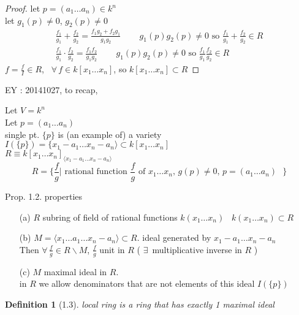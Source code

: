 \documentclass[10pt]{amsart}
\newtheorem{definition}{Definition}
\begin{document}
\begin{multicols*}{2}
\begin{proof}
let $p = (a_1 \dots a_n) \in k^n$ \\
let $g_1(p) \neq 0$, $g_2(p) \neq 0$ 
\[
\begin{gathered}
  \frac{f_1}{g_1 } + \frac{f_2}{g_2} = \frac{f_1 g_2 + f_2 g_1}{ g_1 g_2 } \quad \quad \,  g_1(p)g_2(p) \neq 0 \text{ so } \frac{f_1}{g_1} + \frac{f_2}{g_2} \in R \\
 \frac{f_1}{g_1} \cdot \frac{f_2}{g_2} = \frac{f_1 f_2}{g_1 g_2} \quad \quad \, g_1(p) g_2(p) \neq 0 \text{ so } \frac{f_1}{g_1}\frac{f_2}{g_2} \in R
\end{gathered}
\]
$f= \frac{f}{I} \in R$, \quad \, $\forall \, f\in k[x_1 \dots x_n]$, so $k[x_1 \dots x_n]\subset R$

\end{proof}

EY : 20141027, to recap, 

Let $V = k^n$ \\
Let $p = (a_1 \dots a_n)$ \\
single pt. $\lbrace p \rbrace$ is (an example of) a variety \\
$I(\lbrace p \rbrace) = \lbrace x_1 -a_1 \dots x_n -a_n \rangle \subset k[x_1 \dots x_n]$ \\

$R \equiv k[x_1 \dots x_n]_{\langle x_1 - a_1 \dots x_n-a_n \rangle }$ 
\[
R = \lbrace \frac{f}{g} | \text{ rational function $\frac{f}{g}$ of $x_1 \dots x_n$, $g(p) \neq 0$, $p=(a_1 \dots a_n) $ } \rbrace
\]

Prop. 1.2. properties 

\begin{enumerate}
\item[(a)] $R$ subring of field of rational functions $k(x_1 \dots x_n)$ \quad \, $k(x_1 \dots x_n) \subset R$ 
\item[(b)] $M = \langle x_1 \dots a_1 \dots x_n -a_n \rangle \subset R$.  ideal generated by $x_1 - a_1 \dots x_n-a_n$ \\
Then $\forall \, \frac{f}{g} \in R\backslash M$, $\frac{f}{g}$ unit in $R$ ( $\exists \, $ multiplicative inverse in $R$ )
\item[(c)] $M$ maximal ideal in $R$. \\
in $R$ we allow denominators that are not elements of this ideal $I(\lbrace p \rbrace)$ 
\end{enumerate}

\begin{definition}[1.3] local ring is a ring that has exactly 1 maximal ideal \end{definition}


\end{multicols*}
\end{document}
